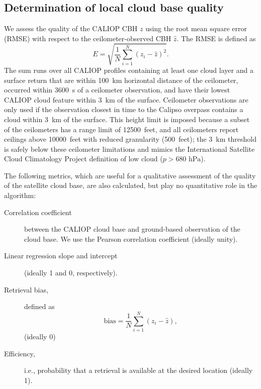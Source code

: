 \documentclass[essd,manuscript]{copernicus}\usepackage[]{graphicx}\usepackage[]{color}
\begin{document}
\subsection{Determination of local cloud base quality}
\label{sec:algorithm:qual}
We assess the quality of the CALIOP CBH $z$ using the root mean square error
(RMSE) with respect to the
ceilometer-observed CBH $\hat{z}$.  The RMSE is defined as
\begin{equation}
  \label{eq:rmse}
  E = \sqrt{\frac{1}{N}\sum\limits_{i = 1}^{N}\left(z_i - \hat{z}\right)^2}.
\end{equation}
The sum runs over all CALIOP profiles containing at least one cloud layer and a
surface return that are within 100~km horizontal distance of the ceilometer,
occurred within 3600~s of a ceilometer observation, and have their lowest CALIOP
cloud feature within 3~km of the surface.  Ceilometer observations are only used
if the observation closest in time to the Calipso overpass contains a cloud
within 3~km of the surface.  This height limit is imposed because a subset of
the ceilometers has a range limit of 12500~feet, and all ceilometers report
ceilings above 10000~feet with reduced granularity (500~feet); the 3~km
threshold is safely below these ceilometer limitations and mimics the
International Satellite Cloud Climatology Project \citep[ISCCP,][]{Rossow1999}
definition of low cloud ($p > 680\text{ hPa}$).

The following metrics, which are useful for a qualitative assessment of the
quality of the satellite cloud base, are also calculated, but play no
quantitative role in the algorithm:
\begin{description}
\item[Correlation coefficient] between the CALIOP cloud base and ground-based
  observation of the cloud base.  We use the Pearson correlation coefficient
  (ideally unity).  
\item[Linear regression slope and intercept] (ideally 1 and 0, respectively).  
\item[Retrieval bias,] defined as
  \begin{equation}
    \label{eq:bias}
    \mbox{bias} = \frac{1}{N}\sum\limits_{i = 1}^{N}\left(z_i - \hat{z}\right),
  \end{equation}(ideally 0)
\item[Efficiency,] i.e., probability that a retrieval is available at the
  desired location (ideally 1).
\end{description}
\end{document}
